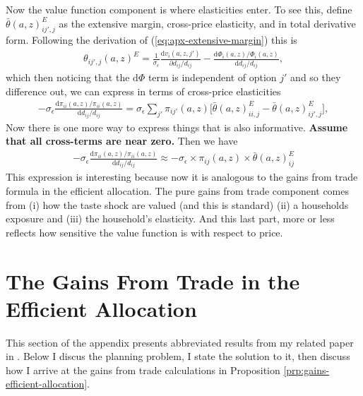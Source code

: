 \documentclass[12pt,pdftex]{article}
\begin{document}
\begin{onehalfspacing}
Now the value function component is where elasticities enter. To see this, define $\bar{\theta}(a,z) ^E_{ij',j}$ as the extensive margin, cross-price elasticity, and in total derivative form. Following the derivation of (\ref{eq:apx-extensive-margin}) this is
\begin{align}
\theta_{ij',j}(a,z)^{E} = \frac{1}{\sigma_{\epsilon}}\frac{\mathrm{d} v_{i}(a, z, j')}{\partial d_{ij}/d_{ij}} -  \frac{\mathrm{d} \Phi_{i}(a,z) / \Phi_{i}(a,z)}{\mathrm{d} d_{ij}/d_{ij}},
\end{align}
which then noticing that the $\mathrm{d} \Phi$ term is independent of option $j'$ and so they difference out, we can express in terms of cross-price elasticities
\begin{align}
-\sigma_{\epsilon} \frac{\mathrm{d} \pi_{ii}(a,z) / \pi_{ii}(a,z) }{\mathrm{d} d_{ij} / d_{ij}} = \sigma_{\epsilon} \sum_{j'} \pi_{ij'}(a,z) \bigg[ \bar{\theta}(a,z) ^E_{ii,j} - \bar{\theta}(a,z) ^E_{ij',j}\bigg],
\end{align}
Now there is one more way to express things that is also informative. \textbf{Assume that all cross-terms are near zero.} Then we have
\begin{align}
-\sigma_{\epsilon} \frac{\mathrm{d} \pi_{ii}(a,z) / \pi_{ii}(a,z) }{\mathrm{d} d_{ij} / d_{ij}} \approx
- \sigma_{\epsilon} \times \pi_{ij}(a,z) \times \bar{\theta}(a,z) ^E_{ij}
\end{align}
This expression is interesting because now it is analogous to the gains from trade formula in the efficient allocation. The pure gains from trade component comes from (i) how the taste shock are valued (and this is standard) (ii) a households exposure and (iii) the household's elasticity. And this last part, more or less reflects how sensitive the value function is with respect to price.

\newpage

\section{The Gains From Trade in the Efficient Allocation}\label{sec:apx-planner}

This section of the appendix presents abbreviated results from my related paper in \citet{waughoptimal}. Below I discus the planning problem, I state the solution to it, then discuss how I arrive at the gains from trade calculations in Proposition \ref{prp:gains-efficient-allocation}.


\end{onehalfspacing}
\end{document}
